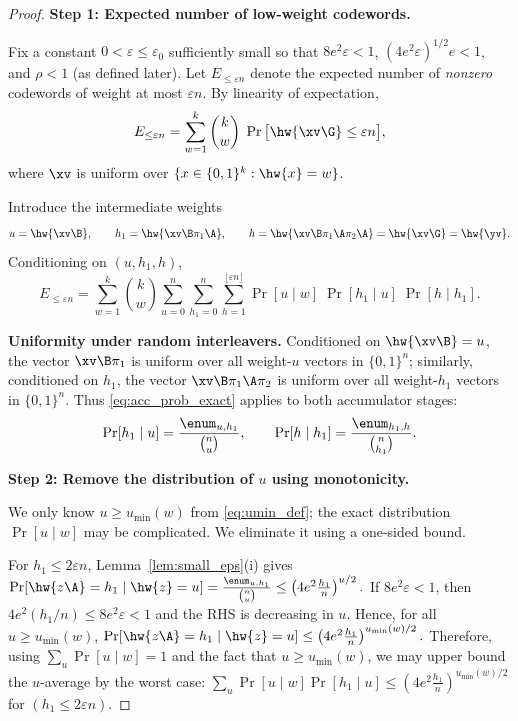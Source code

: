 \begin{proof}

\noindent\textbf{Step 1: Expected number of low-weight codewords.}

Fix a constant $0<\varepsilon\le \varepsilon_0$ sufficiently small so that
$8e^2\varepsilon<1$, $(4e^2\varepsilon)^{1/2}e<1$, and $\rho<1$ (as defined later).  Let $E_{\le \varepsilon n}$ denote the expected number of \emph{nonzero}
codewords of weight at most $\varepsilon n$.
By linearity of expectation,
\begin{equation}
\label{eq:Elow_start}
E_{\le \varepsilon n}
=
\sum_{w=1}^{k} \binom{k}{w}\;
\Pr\big[\hw{\xv\G}\le \varepsilon n\big],
\end{equation}
where $\xv$ is uniform over $\{x\in\{0,1\}^k:\hw{x}=w\}$.

Introduce the intermediate weights
\[
 u=\hw{\xv\B},\qquad
h_1=\hw{\xv\B\pi_1\A},\qquad
h=\hw{\xv\B\pi_1\A\pi_2\A}=\hw{\xv\G}=\hw{\yv}.
\]
Conditioning on $(u,h_1,h)$,
\begin{equation}
\label{eq:Elow_expand}
E_{\le \varepsilon n}
=
\sum_{w=1}^{k} \binom{k}{w}
\sum_{u=0}^{n}\sum_{h_1=0}^{n}\sum_{h=1}^{\lfloor \varepsilon n\rfloor}
\Pr[u \mid w]\;
\Pr[h_1 \mid u]\;
\Pr[h \mid h_1].
\end{equation}

\noindent\textbf{Uniformity under random interleavers.}
Conditioned on $\hw{\xv\B}=u$, the vector $\xv\B\pi_1$ is uniform over all
weight-$u$ vectors in $\{0,1\}^n$; similarly, conditioned on $h_1$, the vector
$\xv\B\pi_1\A\pi_2$ is uniform over all weight-$h_1$ vectors in $\{0,1\}^n$.
Thus \eqref{eq:acc_prob_exact} applies to both accumulator stages:
\begin{equation}
\label{eq:stage_probs}
\Pr[h_1\mid u]=\frac{\enum_{u,h_1}}{\binom{n}{u}},
\qquad
\Pr[h\mid h_1]=\frac{\enum_{h_1,h}}{\binom{n}{h_1}}.
\end{equation}

\noindent\textbf{Step 2: Remove the distribution of $u$ using monotonicity.}

We only know $u\ge u_{\min}(w)$ from \eqref{eq:umin_def}; the exact distribution
$\Pr[u\mid w]$ may be complicated. We eliminate it using a one-sided bound.

For $h_1\le 2\varepsilon n$, Lemma~\ref{lem:small_eps}(i) gives
$
\Pr[\hw{z\A}=h_1\mid \hw{z}=u]
=
\frac{\enum_{u,h_1}}{\binom{n}{u}}
\le \left(4e^2\frac{h_1}{n}\right)^{u/2}.
$
If $8e^2\varepsilon<1$, then $4e^2(h_1/n)\le 8e^2\varepsilon<1$ and the RHS is
decreasing in $u$. Hence, for all $u\ge u_{\min}(w)$,
$
\Pr[\hw{z\A}=h_1\mid \hw{z}=u]
\le \left(4e^2\frac{h_1}{n}\right)^{u_{\min}(w)/2}.
$
Therefore, using $\sum_u \Pr[u\mid w]=1$ and the fact that $u\ge u_{\min}(w)$,
we may upper bound the $u$-average by the worst case:
$
\sum_{u}\Pr[u\mid w]\Pr[h_1\mid u]
\le
\left(4e^2\frac{h_1}{n}\right)^{u_{\min}(w)/2}$ for $ (h_1\le 2\varepsilon n).
$


\end{proof}
